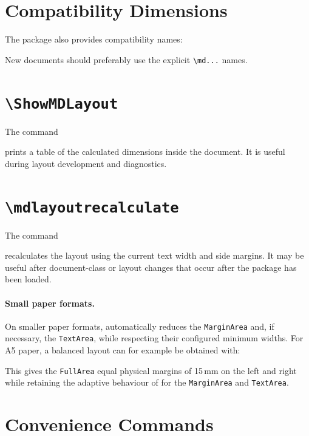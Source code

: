 \documentclass[
11pt,
a4paper,
oneside
]{scrbook}
\begin{document}

\section{Compatibility Dimensions}

The package also provides compatibility names:




New documents should preferably use the explicit \verb|\md...| names.

\section{\texttt{\textbackslash ShowMDLayout}}

The command




prints a table of the calculated dimensions inside the document.
It is useful during layout development and diagnostics.

\section{\texttt{\textbackslash mdlayoutrecalculate}}

The command




recalculates the layout using the current text width and side margins.
It may be useful after document-class or layout changes that occur after the
package has been loaded.

\paragraph{Small paper formats.}
On smaller paper formats, \MDWordmark automatically reduces the
\texttt{MarginArea} and, if necessary, the \texttt{TextArea}, while
respecting their configured minimum widths.
For A5 paper, a balanced layout can for example be obtained with:




This gives the \texttt{FullArea} equal physical margins of 15\,mm on
the left and right while retaining the adaptive behaviour of
\MDWordmark for the \texttt{MarginArea} and \texttt{TextArea}.

\section{Convenience Commands}
\end{document}
